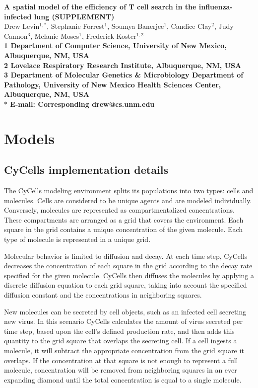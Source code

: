 \documentclass[preprint,10pt,authoryear]{article}
\date{}
\begin{document}
\begin{flushleft}
{\Large
\textbf{A spatial model of the efficiency of T cell search in the influenza-infected lung (SUPPLEMENT)}
}
\\
Drew Levin$^{1,\ast}$, 
Stephanie Forrest$^{1}$, 
Soumya Banerjee$^{1}$,
Candice Clay$^{2}$, 
Judy Cannon$^{3}$,
Melanie Moses$^{1}$, 
Frederick Koster$^{1,2}$
\\
\bf{1} Department of Computer Science, University of New Mexico, Albuquerque, NM, USA
\\
\bf{2} Lovelace Respiratory Research Institute, Albuquerque, NM, USA
\\
\bf{3} Department of Molecular Genetics \& Microbiology Department of Pathology, University of New Mexico Health Sciences Center, Albuquerque, NM, USA
\\
$\ast$ E-mail: Corresponding drew@cs.unm.edu
\end{flushleft}


\section{Models}

\subsection{CyCells implementation details}

The CyCells modeling environment splits its populations into two types: cells and molecules.  Cells are considered to be unique agents and are modeled individually.  Conversely, molecules are represented as compartmentalized concentrations.  These compartments are arranged as a grid that covers the environment.  Each square in the grid contains a unique concentration of the given molecule.  Each type of  molecule is represented in a unique grid.

Molecular behavior is limited to diffusion and decay.  At each time step, CyCells decreases the concentration of each square in the grid according to the decay rate specified for the given molecule.  CyCells then diffuses the molecules by applying a discrete diffusion equation to each grid square, taking into account the specified diffusion constant and the concentrations in neighboring squares.

New molecules can be secreted by cell objects, such as an infected cell secreting new virus.  In this scenario CyCells calculates the amount of virus secreted per time step, based upon the cell's defined production rate, and then adds this quantity to the grid square that overlaps the secreting cell.  If a cell ingests a molecule, it will subtract the appropriate concentration from the grid square it overlaps.  If the concentration at that square is not enough to represent a full molecule, concentration will be removed from neighboring squares in an ever expanding diamond until the total concentration is equal to a single molecule.
\end{document}
